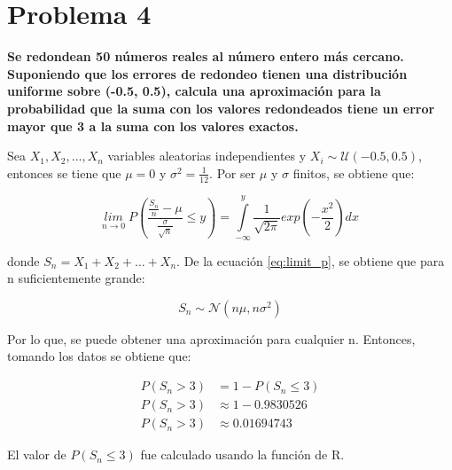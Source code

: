 \section*{Problema 4}

\textbf{Se redondean 50 números reales al número entero más cercano. Suponiendo que los errores de redondeo tienen una distribución uniforme sobre (-0.5, 0.5), calcula una aproximación para la probabilidad que la suma con los valores redondeados tiene un error mayor que 3 a la suma con los valores exactos.}

Sea $X_1,X_2,\dots, X_n$ variables aleatorias independientes y $X_i \sim \mathcal{U}(-0.5,0.5)$, entonces se tiene que $\mu = 0$ y $\sigma^2 = \frac{1}{12}$. Por ser $\mu$ y $\sigma$ finitos, se obtiene que:

\begin{equation}
    \underset{n\rightarrow 0}{lim}\;P\left(\frac{\frac{S_n}{n}-\mu}{\frac{\sigma}{\sqrt{n}}} \leq y\right) = \int\limits_{-\infty}^{y}  \frac{1}{\sqrt{2\pi}} exp\left(-\frac{x^2}{2} \right ) dx \label{eq:limit_p}
\end{equation}

donde $S_n = X_1+X_2+\dots+X_n$. De la ecuación \ref{eq:limit_p}, se obtiene que para n suficientemente grande:

\begin{equation*}
    S_n \sim \mathcal{N}(n\mu,n\sigma^2)
\end{equation*}

Por lo que, se puede obtener una aproximación para cualquier n. Entonces, tomando los datos se obtiene que:

\begin{align*}
    P(S_n > 3) & = 1- P(S_n \leq 3)    \\
    P(S_n > 3) & \approx 1 - 0.9830526 \\
    P(S_n > 3) & \approx 0.01694743
\end{align*}

El valor de $P(S_n \leq 3)$ fue calculado usando la función  de R.